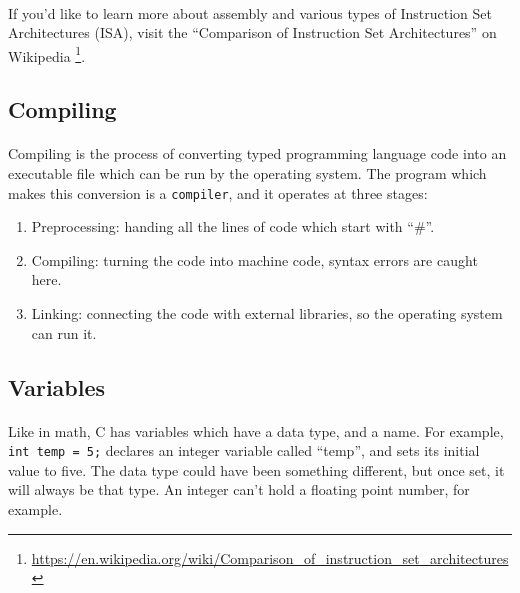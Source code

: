 \documentclass[letter,11pt]{article}
\begin{document}
\paragraph{}If you'd like to learn more about assembly and various types of Instruction Set Architectures (ISA), visit the ``Comparison of Instruction Set Architectures'' on Wikipedia \footnote{\url{https://en.wikipedia.org/wiki/Comparison_of_instruction_set_architectures}}.

\subsection{Compiling}
\paragraph{}Compiling is the process of converting typed programming language code into an executable file which can be run by the operating system. The program which makes this conversion is a \texttt{compiler}, and it operates at three stages:
\begin{enumerate}
    \item Preprocessing: handing all the lines of code which start with ``\#''.
    \item Compiling: turning the code into machine code, syntax errors are caught here.
    \item Linking: connecting the code with external libraries, so the operating system can run it.
\end{enumerate}

\subsection{Variables}
\paragraph{}Like in math, C has variables which have a data type, and a name. For example, \texttt{int temp = 5;} declares an integer variable called ``temp'', and sets its initial value to five. The data type could have been something different, but once set, it will always be that type. An integer can't hold a floating point number, for example.
\end{document}
